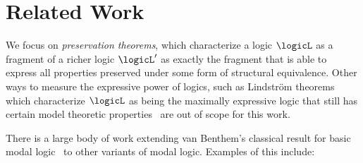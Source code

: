 \section{Related Work}\label{sec:related-work}
We focus on \emph{preservation theorems}, which characterize a logic $\logicL$ as a fragment of a richer logic $\logicL'$ as exactly the fragment that is able to express all properties preserved under some form of structural equivalence.
Other ways to measure the expressive power of logics, such as Lindström theorems which characterize $\logicL$ as being the maximally expressive logic that still has certain model theoretic properties~\cite{benthem2009} are out of scope for this work.

There is a large body of work extending van Benthem's classical result for basic modal logic~\cite{van1983modal} to other variants of modal logic.
Examples of this include:
